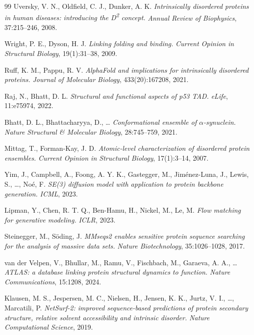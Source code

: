 \documentclass[12pt]{article}
\begin{document}
\begin{thebibliography}{99}
Uversky, V. N., Oldfield, C. J., Dunker, A. K.
\textit{Intrinsically disordered proteins in human diseases: introducing the D\textsuperscript{2} concept.}
\textit{Annual Review of Biophysics}, 37:215--246, 2008.

Wright, P. E., Dyson, H. J.
\textit{Linking folding and binding.}
\textit{Current Opinion in Structural Biology}, 19(1):31--38, 2009.

Ruff, K. M., Pappu, R. V.
\textit{AlphaFold and implications for intrinsically disordered proteins.}
\textit{Journal of Molecular Biology}, 433(20):167208, 2021.

Raj, N., Bhatt, D. L.
\textit{Structural and functional aspects of p53 TAD.}
\textit{eLife}, 11:e75974, 2022.

Bhatt, D. L., Bhattacharyya, D., \ldots
\textit{Conformational ensemble of $\alpha$-synuclein.}
\textit{Nature Structural \& Molecular Biology}, 28:745--759, 2021.

Mittag, T., Forman-Kay, J. D.
\textit{Atomic-level characterization of disordered protein ensembles.}
\textit{Current Opinion in Structural Biology}, 17(1):3--14, 2007.

Yim, J., Campbell, A., Foong, A. Y. K., Gastegger, M., Jim{\'e}nez-Luna, J., Lewis, S., \ldots, No{\'e}, F.
\textit{SE(3) diffusion model with application to protein backbone generation.}
\textit{ICML}, 2023.

Lipman, Y., Chen, R. T. Q., Ben-Hamu, H., Nickel, M., Le, M.
\textit{Flow matching for generative modeling.}
\textit{ICLR}, 2023.

Steinegger, M., S\"{o}ding, J.
\textit{MMseqs2 enables sensitive protein sequence searching for the analysis of massive data sets.}
\textit{Nature Biotechnology}, 35:1026--1028, 2017.

van der Velpen, V., Bhullar, M., Ramu, V., Fischbach, M., Garaeva, A. A., \ldots
\textit{ATLAS: a database linking protein structural dynamics to function.}
\textit{Nature Communications}, 15:1208, 2024.

Klausen, M. S., Jespersen, M. C., Nielsen, H., Jensen, K. K., Jurtz, V. I., \ldots, Marcatili, P.
\textit{NetSurf-2: improved sequence-based predictions of protein secondary structure, relative solvent accessibility and intrinsic disorder.}
\textit{Nature Computational Science}, 2019.


\end{thebibliography}
\end{document}
